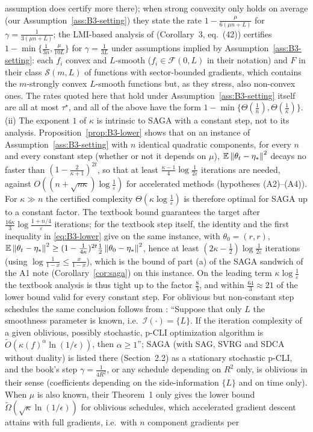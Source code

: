 \begin{remark}
assumption does certify more there); when strong convexity only holds on average (our Assumption~\ref{ass:B3-setting}) they state the rate $1-\frac{\mu}{6(\mu n+L)}$ for $\gamma=\frac{1}{3(\mu n+L)}$; the LMI-based analysis of \cite{hu2017unified} (Corollary~3, eq.~(42)) certifies $1-\min\{\frac1{3n},\frac{\mu}{10L}\}$ for $\gamma=\frac1{3L}$ under assumptions implied by Assumption~\ref{ass:B3-setting}: each $f_i$ convex and $L$-smooth ($f_i\in\mathcal F(0,L)$ in their notation) and $F$ in their class $\mathcal S(m,L)$ of functions with sector-bounded gradients, which contains the $m$-strongly convex $L$-smooth functions but, as they stress, also non-convex ones. The rates quoted here that hold under Assumption~\ref{ass:B3-setting} itself are all at most $\tau^\star$, and all of the above have the form $1-\min\{\Theta(\frac1n),\Theta(\frac1\kappa)\}$. (ii) The exponent $1$ of $\kappa$ is intrinsic to SAGA with a constant step, not to its analysis. Proposition~\ref{prop:B3-lower} shows that on an instance of Assumption~\ref{ass:B3-setting} with $n$ identical quadratic components, for every $n$ and every constant step (whether or not it depends on $\mu$), $\mathbb{E}\left\|\theta_t-\eta_\ast\right\|^2$ decays no faster than $(1-\frac{2}{\kappa+1})^{2t}$, so that at least $\frac{\kappa-1}{4}\log\frac1{2\varepsilon}$ iterations are needed, against $O((n+\sqrt{n\kappa})\log\frac1\varepsilon)$ for accelerated methods (hypotheses (A2)--(A4)). For $\kappa\gg n$ the certified complexity $\Theta(\kappa\log\frac1\varepsilon)$ is therefore optimal for SAGA up to a constant factor. The textbook bound guarantees the target after $\frac{16\kappa}{3}\log\frac{1+n/4}{\varepsilon}$ iterations; for the textbook step itself, the identity and the first inequality in \eqref{eq:B3-lower} give on the same instance, with $\theta_0=(r,r)$, $\mathbb{E}\left\|\theta_t-\eta_\ast\right\|^2\ge(1-\frac1{4\kappa})^{2t}\frac12\left\|\theta_0-\eta_\ast\right\|^2$, hence at least $(2\kappa-\frac12)\log\frac1{2\varepsilon}$ iterations (using $\log\frac1{1-x}\le\frac x{1-x}$), which is the bound of part (a) of the SAGA sandwich of the A1 note (Corollary~\ref{cor:saga}) on this instance. On the leading term $\kappa\log\frac1\varepsilon$ the textbook analysis is thus tight up to the factor $\frac83$, and within $\frac{64}{3}\approx21$ of the lower bound valid for every constant step. For oblivious but non-constant step schedules the same conclusion follows from \cite[Theorem~2]{arjevani2016iteration}: ``Suppose that only $L$ the smoothness parameter is known, i.e.\ $\mathcal I(\cdot)=\{L\}$. If the iteration complexity of a given oblivious, possibly stochastic, p-CLI optimization algorithm is $\tilde O(\kappa(f)^\alpha\ln(1/\epsilon))$, then $\alpha\ge1$''; SAGA (with SAG, SVRG and SDCA without duality) is listed there (Section~2.2) as a stationary stochastic p-CLI, and the book's step $\gamma=\frac1{4R^2}$, or any schedule depending on $R^2$ only, is oblivious in their sense (coefficients depending on the side-information $\{L\}$ and on time only). When $\mu$ is also known, their Theorem~1 only gives the lower bound $\tilde\Omega(\sqrt\kappa\ln(1/\epsilon))$ for oblivious schedules, which accelerated gradient descent attains with full gradients, i.e.\ with $n$ component gradients per 
\end{remark}
